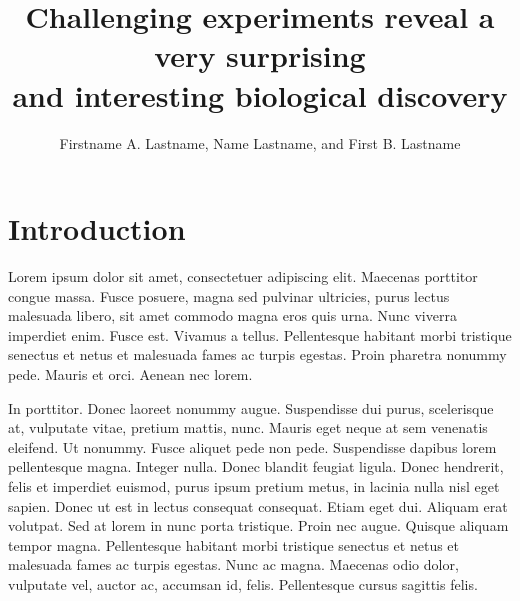 \documentclass{biorxiv}
\title{Challenging experiments reveal a very surprising\\
  and interesting biological discovery}
\author{Firstname A. Lastname,\affil{a,b,c} Name Lastname,\affil{a}
  and First B. Lastname\affil{a,d,*}}
\begin{document}
\maketitle


\section{Introduction}
Lorem ipsum dolor sit amet, consectetuer adipiscing
elit\cite{Lastname1971a,Lastname1953a,Lastname2019a}. Maecenas porttitor
congue massa. Fusce posuere, magna sed pulvinar ultricies, purus lectus
malesuada libero, sit amet commodo magna eros quis urna. Nunc viverra
imperdiet enim. Fusce est. Vivamus a tellus. Pellentesque habitant morbi
tristique senectus et netus et malesuada fames ac turpis egestas. Proin
pharetra nonummy pede. Mauris et orci. Aenean nec lorem.

In porttitor. Donec laoreet nonummy augue. Suspendisse dui purus, scelerisque
at, vulputate vitae, pretium mattis, nunc. Mauris eget neque at sem venenatis
eleifend. Ut nonummy. Fusce aliquet pede non pede. Suspendisse dapibus lorem
pellentesque magna. Integer nulla. Donec blandit feugiat ligula. Donec
hendrerit, felis et imperdiet euismod, purus ipsum pretium metus, in lacinia
nulla nisl eget sapien. Donec ut est in lectus consequat consequat. Etiam eget
dui. Aliquam erat volutpat. Sed at lorem in nunc porta tristique. Proin nec
augue. Quisque aliquam tempor magna. Pellentesque habitant morbi tristique
senectus et netus et malesuada fames ac turpis egestas. Nunc ac magna.
Maecenas odio dolor, vulputate vel, auctor ac, accumsan id, felis.
Pellentesque cursus sagittis felis.
\end{document}
